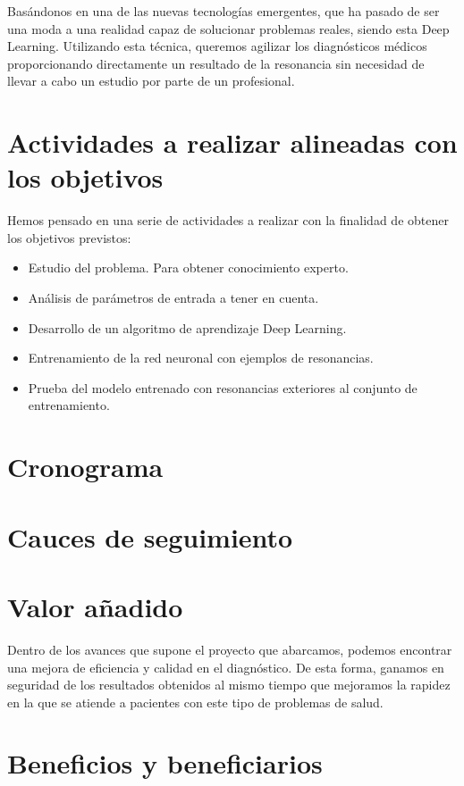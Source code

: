 \documentclass[a4paper,12pt,oneside]{article}
\begin{document}
Basándonos en una de las nuevas tecnologías emergentes, que ha pasado de ser una moda a una realidad capaz de solucionar problemas reales, siendo esta Deep Learning. Utilizando esta técnica, queremos agilizar los diagnósticos médicos proporcionando directamente un resultado de la resonancia sin necesidad de llevar a cabo un estudio por parte de un profesional.

\section{Actividades a realizar alineadas con los objetivos}

Hemos pensado en una serie de actividades a realizar con la finalidad de obtener los objetivos previstos:

\begin{itemize}
	\item Estudio del problema. Para obtener conocimiento experto.
	\item Análisis de parámetros de entrada a tener en cuenta.
	\item Desarrollo de un algoritmo de aprendizaje Deep Learning.
	\item Entrenamiento de la red neuronal con ejemplos de resonancias.
	\item Prueba del modelo entrenado con resonancias exteriores al conjunto de entrenamiento.
\end{itemize}

\section{Cronograma}

\section{Cauces de seguimiento}

\section{Valor añadido}

Dentro de los avances que supone el proyecto que abarcamos, podemos encontrar una mejora de eficiencia y calidad en el diagnóstico. De esta forma, ganamos en seguridad de los resultados obtenidos al mismo tiempo que mejoramos la rapidez en la que se atiende a pacientes con este tipo de problemas de salud.

\section{Beneficios y beneficiarios}
\end{document}
